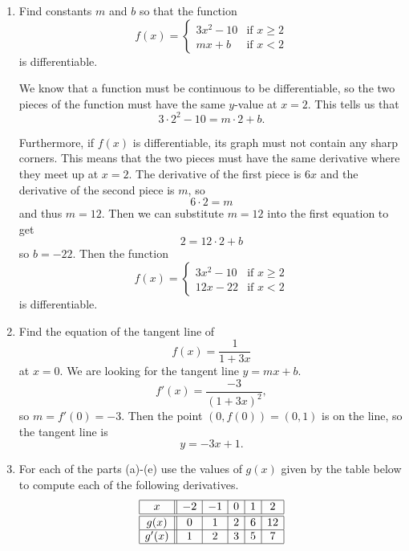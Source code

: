 \documentclass[11pt]{article}
\begin{document}
\begin{enumerate}
\begin{enumerate}
  \end{enumerate}

\newpage

\item Find constants $m$ and $b$ so that the function
  \[
  f(x) = \begin{cases} 3x^2-10 &\mbox{if } x\geq 2\\
    mx+b &\mbox{if } x < 2 \end{cases}
  \]
  is differentiable.
  \vfill
  {\color{blue}
  
    We know that a function must be continuous to be differentiable,
    so the two pieces of the function must have the same \(y\)-value
    at \(x=2\).  This tells us that
    \[
    3\cdot2^2 - 10 = m\cdot 2 +b.
    \]
    
    Furthermore, if \(f(x)\) is differentiable, its graph must not contain
    any sharp corners.  This means that the two pieces must have the
    same derivative where they meet up at \(x=2\).  The derivative of
    the first piece is \(6x\) and the derivative of the second piece
    is \(m\), so \[6\cdot 2 = m\] and thus \(m=12\).  Then we can
    substitute \(m=12\) into the first equation to get \[2 = 12\cdot 2 +
    b\] so \(b=-22\).  Then the function
    \[
    f(x)=\begin{cases}
      3x^2 - 10 &\mbox{if } x\geq 2\\
      12x - 22  &\mbox{if } x < 2
    \end{cases}
    \]
    is differentiable.

  }
  \vfill

\newpage

\item Find the equation of the tangent line of
  \[
  f(x)=\frac{1}{1+3x}
  \]
  at $x=0$.
\vfill
{\color{blue}
  We are looking for the tangent line $y=mx+b$.
  \[
  f'(x)=\frac{-3}{(1+3x)^2},
  \]
  so $m=f'(0)=-3$.  Then the point $(0,f(0))=(0,1)$ is on the line, so
  the tangent line is
  \[
  y=-3x+1.
  \]
}
\vfill
\newpage

\item For each of the parts (a)-(e) use the values of $g(x)$ given by
  the table below to compute each of the following derivatives.
  \[
  \begin{array}{|c||c|c|c|c|c|}
    \hline
    x&-2&-1&0&1&2\\
    \hline
    \hline
    g(x)&0&1&2&6&12\\
    \hline
    g'(x)&1&2&3&5&7\\
    \hline
  \end{array}
  \]


\end{enumerate}
\end{document}
